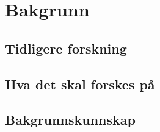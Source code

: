 \section{Bakgrunn}

\subsection{Tidligere forskning}

\subsection{Hva det skal forskes på}

\subsection{Bakgrunnskunnskap}

\newpage